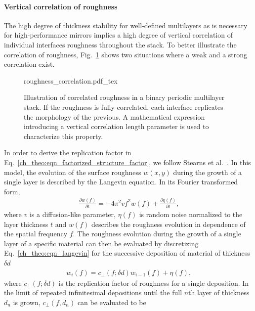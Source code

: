 \paragraph{Vertical correlation of roughness}
The high degree of thickness stability for well-defined multilayers as is necessary for high-performance mirrors implies a high degree of vertical correlation of individual interfaces roughness throughout the stack. To better illustrate the correlation of roughness, Fig.~\ref{ch_theo:fig_vertical_roughness_correlation} shows two situations where a weak and a strong correlation exist.
\begin{figure}[htb]
    \def\svgwidth{\textwidth}
    {roughness_correlation.pdf_tex}
    \caption[Illustration of correlated roughness in a binary periodic multilayer stack.]{Illustration of correlated roughness in a binary periodic multilayer stack. If the roughness is fully correlated, each interface replicates the morphology of the previous. A mathematical expression introducing a vertical correlation length parameter is used to characterize this property.}
    \label{ch_theo:fig_vertical_roughness_correlation}
\end{figure}
In order to derive the replication factor in Eq.~\eqref{ch_theo:eqn_factorized_structure_factor}, we follow Stearns et al.~\cite{stearns_x-ray_1992}. In this model, the evolution of the surface roughness $w(x,y)$ during the growth of a single layer is described by the Langevin equation. In its Fourier transformed form, 
\begin{align}
\frac{\partial w(f)}{\partial t} = - 4 \pi^2 v f^2 w(f) + \frac{\partial \eta(f)}{\partial t} \text{,} \label{ch_theo:eqn_langevin}
\end{align}
where $v$ is a diffusion-like parameter, $\eta(f)$ is random noise normalized to the layer thickness $t$ and $w(f)$ describes the roughness evolution in dependence of the spatial frequency $f$. The roughness evolution during the growth of a single layer of a specific material can then be evaluated by discretizing Eq.~\eqref{ch_theo:eqn_langevin} for the successive deposition of material of thickness $\delta d$
\begin{align}
w_i(f) = c_\perp(f;\delta d) w_{i-1}(f) + \eta(f) \text{,}
\end{align}
where $c_\perp(f;\delta d)$ is the replication factor of roughness for a single deposition. In the limit of repeated infinitesimal depositions until the full $n$th layer of thickness $d_n$ is grown, $c_\perp(f,d_n)$ can be evaluated to be~\cite{spiller_multilayer_1993}
